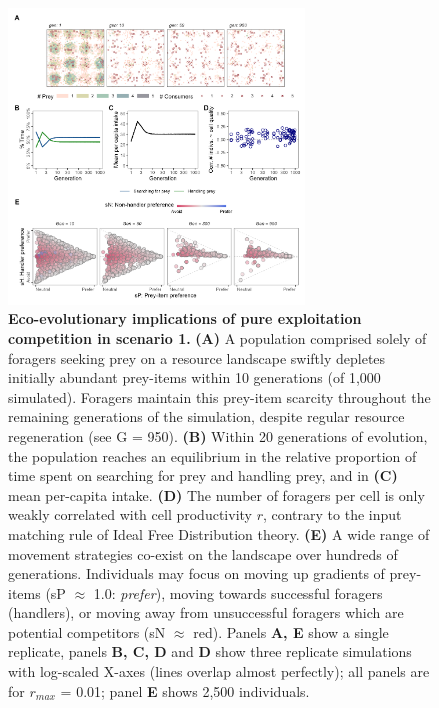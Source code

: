 \begin{figure}[h!]
    \centering
    \includegraphics[width=0.7\textwidth]{figures/kleptomove/fig_01.png}
    \caption{
        \textbf{Eco-evolutionary implications of pure exploitation competition in scenario 1.}
        \textbf{(A)} A population comprised solely of foragers seeking prey on a resource landscape swiftly depletes initially abundant prey-items within 10 generations (of 1,000 simulated).
        Foragers maintain this prey-item scarcity throughout the remaining generations of the simulation, despite regular resource regeneration (see G = 950).
        \textbf{(B)} Within 20 generations of evolution, the population reaches an equilibrium in the relative proportion of time spent on searching for prey and handling prey, and in \textbf{(C)} mean per-capita intake.
        \textbf{(D)} The number of foragers per cell is only weakly correlated with cell productivity $r$, contrary to the input matching rule of Ideal Free Distribution theory.
        \textbf{(E)} A wide range of movement strategies co-exist on the landscape over hundreds of generations.
        Individuals may focus on moving up gradients of prey-items (sP $\approx$ 1.0: \textit{prefer}), moving towards successful foragers (handlers), or moving away from unsuccessful foragers which are potential competitors (sN $\approx$ red).
        Panels \textbf{A, E} show a single replicate, panels \textbf{B, C, D} and \textbf{D} show three replicate simulations with log-scaled X-axes (lines overlap almost perfectly); all panels are for $r_{max}$ = 0.01; panel \textbf{E} shows 2,500 individuals.
    }
    \label{fig1}
\end{figure}

